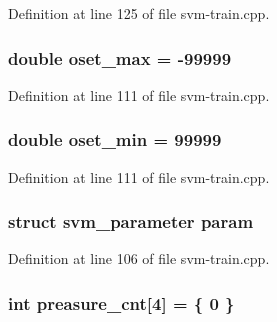 Definition at line 125 of file svm-\/train.\-cpp.

\hypertarget{_2svm-train_8cpp_a6a83be17519c65392007b1449d5246e9}{
\subsubsection[{oset\-\_\-max}]{\setlength{\rightskip}{0pt plus 5cm}double oset\-\_\-max = -\/99999}}\label{_2svm-train_8cpp_a6a83be17519c65392007b1449d5246e9}


Definition at line 111 of file svm-\/train.\-cpp.

\hypertarget{_2svm-train_8cpp_a2bcd8955244b3b5ed1918acc0ce4014e}{
\subsubsection[{oset\-\_\-min}]{\setlength{\rightskip}{0pt plus 5cm}double oset\-\_\-min = 99999}}\label{_2svm-train_8cpp_a2bcd8955244b3b5ed1918acc0ce4014e}


Definition at line 111 of file svm-\/train.\-cpp.

\hypertarget{_2svm-train_8cpp_abef2e39cc4fa6cc6870dddf9afa2cfad}{
\subsubsection[{param}]{\setlength{\rightskip}{0pt plus 5cm}struct {\bf svm\-\_\-parameter} param}}\label{_2svm-train_8cpp_abef2e39cc4fa6cc6870dddf9afa2cfad}


Definition at line 106 of file svm-\/train.\-cpp.

\hypertarget{_2svm-train_8cpp_aee8f27d5a82f967da296688aee11c230}{
\subsubsection[{preasure\-\_\-cnt}]{\setlength{\rightskip}{0pt plus 5cm}int preasure\-\_\-cnt\mbox{[}4\mbox{]} = \{ 0 \}}}\label{_2svm-train_8cpp_aee8f27d5a82f967da296688aee11c230}



